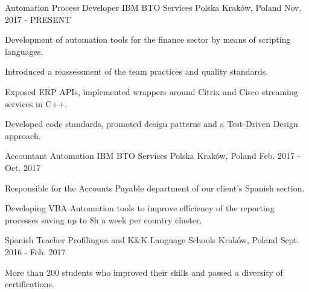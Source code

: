 

\begin{cventries}

  \cventry
    {Automation Process Developer} %
    {IBM BTO Services Polska} %
    {Kraków, Poland} %
    {Nov. 2017 - PRESENT} %
    {
      \begin{cvitems} %
        \item {Development of automation tools for the finance sector by means of scripting languages.}
        \item {Introduced a reassessment of the team practices and quality standards.}
		\item {Exposed ERP APIs, implemented wrappers around Citrix and Cisco streaming services in C++.}
        \item {Developed code standards, promoted design patterns and a Test-Driven Design approach.}
      \end{cvitems}
    }

  \cventry
    {Accountant Automation} %
    {IBM BTO Services Polska} %
	{Kraków, Poland} %
	{Feb. 2017 - Oct. 2017} %
    {
      \begin{cvitems} %
        \item {Responsible for the Accounts Payable department of our client's Spanish section.}
        \item {Developing VBA Automation tools to improve efficiency of the reporting processes saving up to 8h a week per country cluster.}
      \end{cvitems}
    }

  \cventry
    {Spanish Teacher} %
    {Profilingua and K\&K Language Schools} %
	{Kraków, Poland} %
	{Sept. 2016 - Feb. 2017} %
    {
      \begin{cvitems} %
        \item {More than 200 students who improved their skills and passed a diversity of certifications.}
      \end{cvitems}
    }

\end{cventries}
